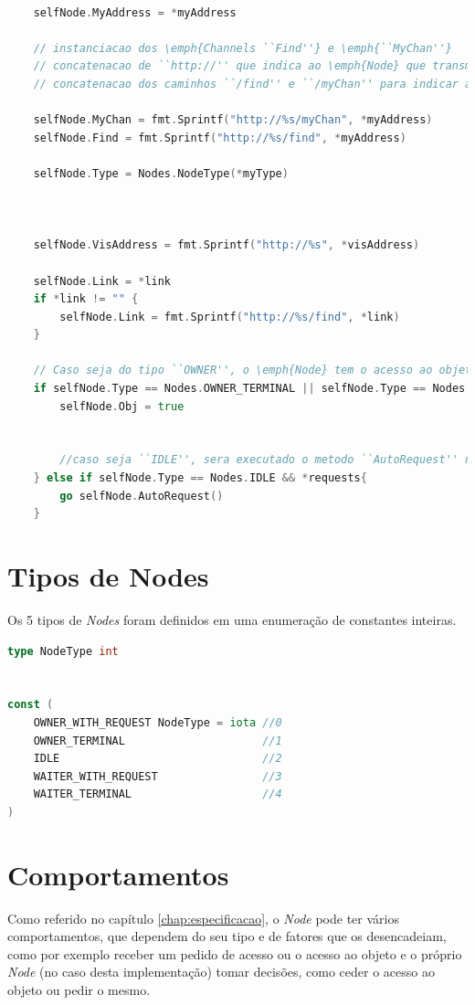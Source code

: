 \begin{lstlisting}[caption={Instanciação dos atributos do \emph{Node}.},language=Go]

	selfNode.MyAddress = *myAddress

	// instanciacao dos \emph{Channels ``Find''} e \emph{``MyChan''}
	// concatenacao de ``http://'' que indica ao \emph{Node} que transmitira o pedido que este deve ser um pedido \acs{HTTP}
	// concatenacao dos caminhos ``/find'' e ``/myChan'' para indicar aos \emph{Nodes} para que \emph{Channel} sera enviado

	selfNode.MyChan = fmt.Sprintf("http://%s/myChan", *myAddress)
	selfNode.Find = fmt.Sprintf("http://%s/find", *myAddress)

	selfNode.Type = Nodes.NodeType(*myType)



	selfNode.VisAddress = fmt.Sprintf("http://%s", *visAddress)

	selfNode.Link = *link
	if *link != "" {
		selfNode.Link = fmt.Sprintf("http://%s/find", *link)
	}

	// Caso seja do tipo ``OWNER'', o \emph{Node} tem o acesso ao objeto
	if selfNode.Type == Nodes.OWNER_TERMINAL || selfNode.Type == Nodes.OWNER_WITH_REQUEST {
		selfNode.Obj = true


		//caso seja ``IDLE'', sera executado o metodo ``AutoRequest'' numa nova \emph{Goroutine}
	} else if selfNode.Type == Nodes.IDLE && *requests{ 
		go selfNode.AutoRequest()
	}

\end{lstlisting}


\section{Tipos de Nodes}
\label{implementacao:sec:tipos_node}

Os 5 tipos de \emph{Nodes} foram definidos em uma enumeração de constantes inteiras.
\begin{lstlisting}[caption={Definição da enumeração dos tipos de \emph{Node}},language=Go]
type NodeType int


const (
	OWNER_WITH_REQUEST NodeType = iota //0
	OWNER_TERMINAL                     //1
	IDLE                               //2
	WAITER_WITH_REQUEST                //3
	WAITER_TERMINAL					   //4
)

\end{lstlisting}

\section{Comportamentos}
\label{implementacao:sec:comportamentos}
Como referido no capítulo \ref{chap:especificacao}, 
o \emph{Node} pode ter vários comportamentos, 
que dependem do seu tipo e de fatores que os desencadeiam, como por exemplo receber um pedido de acesso ou o acesso ao objeto e 
o próprio \emph{Node} (no caso desta implementação) tomar decisões, como ceder o acesso ao objeto ou pedir o mesmo.

